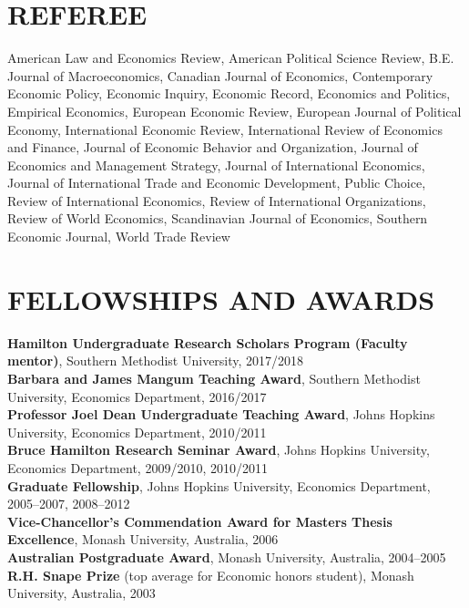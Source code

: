 \documentclass[11pt]{res}
\begin{document}
\begin{resume}
\section{REFEREE} \vspace{1.5mm}
American Law and Economics Review, American Political Science Review, B.E. Journal of Macroeconomics, Canadian Journal of Economics, Contemporary Economic Policy, Economic Inquiry, 
Economic Record, Economics and Politics, Empirical Economics, European Economic Review, European Journal of Political Economy, International Economic Review, International Review of Economics and Finance, Journal of Economic Behavior and Organization, Journal of Economics and Management Strategy, 
Journal of International Economics, Journal of International Trade and Economic Development, Public Choice, Review of International Economics, Review of International Organizations, Review of World Economics, Scandinavian Journal of Economics, Southern Economic Journal, World Trade Review

\phantom{.}\vspace{0cm}
\section{FELLOWSHIPS AND AWARDS}\vspace{2mm}
{\bf Hamilton Undergraduate Research Scholars Program (Faculty mentor)}, Southern Methodist University, 2017/2018\vspace{1.5mm}\\
{\bf Barbara and James Mangum Teaching Award}, Southern Methodist University, Economics Department, 2016/2017\vspace{1.5mm}\\
{\bf Professor Joel Dean Undergraduate Teaching Award}, Johns Hopkins University, Economics Department, 2010/2011\vspace{1.5mm}\\
{\bf Bruce Hamilton Research Seminar Award}, Johns Hopkins University, Economics Department, 2009/2010, 2010/2011\vspace{1.5mm}\\
{\bf Graduate Fellowship}, Johns Hopkins University, Economics Department, 2005--2007, 2008--2012\vspace{1.5mm}\\
{\bf Vice-Chancellor's Commendation Award for Masters Thesis Excellence}, Monash University, Australia, 2006\vspace{1.5mm}\\
{\bf Australian Postgraduate Award}, Monash University, Australia, 2004--2005\vspace{1.5mm}\\
{\bf R.H. Snape Prize} (top average for Economic honors student), Monash University, Australia, 2003

\end{resume}
\end{document}
